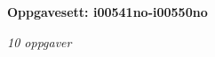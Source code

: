 \centerline{\bf Oppgavesett: i00541no-i00550no}
\vskip 10pt
\centerline{\it 10 oppgaver}\vskip 10pt
\vskip 10pt
